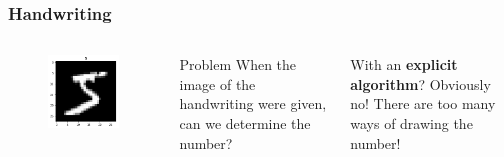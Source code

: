 \documentclass[aspectratio=169]{beamer}
\begin{document}
\begin{frame}[fragile]
	\frametitle{Handwriting}
	\begin{columns}
		\begin{figure}
			\includegraphics[width=1.0\textwidth]{imgs/mnist_5.png}
		\end{figure}
		\begin{block}{Problem}
			When the image of the handwriting were given, can we determine the number?
		\end{block}
		 With an \textbf{explicit algorithm}? Obviously no! There are too many ways of drawing the number!
	\end{columns}
\end{frame}
\end{document}
